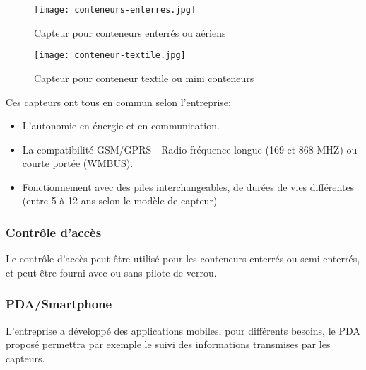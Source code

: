\documentclass[a4paper,12pt]{report}
\begin{document}
\begin {figure}[H]
\begin{center} \texttt{[image: conteneurs-enterres.jpg]}
\caption{Capteur pour conteneurs enterrés ou aériens
\cite{ref8}}
\label{enterre}
\end{center}

\begin{center} \texttt{[image: conteneur-textile.jpg]}
\caption{Capteur pour conteneur textile ou mini conteneurs \cite{ref4}}
\label{textile}
\end{center}

\end{figure}
Ces capteurs ont tous en commun selon l'entreprise:
\begin{itemize}
\item L'autonomie en énergie et en communication.
\item La compatibilité GSM/GPRS - Radio fréquence longue (169 et 868 MHZ) ou courte portée (WMBUS).
\item Fonctionnement avec des piles interchangeables, de durées de vies différentes (entre 5 à 12 ans selon le modèle de capteur)
\end{itemize}


\subsubsection*{Contrôle d'accès }
Le contrôle d'accès peut être utilisé pour les conteneurs enterrés ou semi enterrés, et peut être fourni avec ou sans pilote de verrou.
\subsubsection*{PDA/Smartphone }
L'entreprise a développé des applications mobiles, pour différents besoins, le PDA proposé permettra par exemple le suivi des informations transmises par les capteurs.
\end{document}
